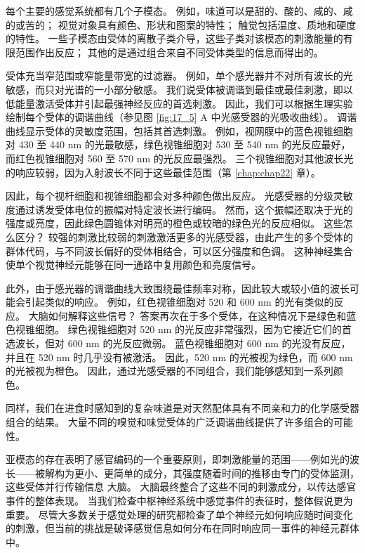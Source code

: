 每个主要的感觉系统都有几个子模态。 
例如，味道可以是甜的、酸的、咸的、咸的或苦的； 
视觉对象具有颜色、形状和图案的特性； 
触觉包括温度、质地和硬度的特性。 
一些子模态由受体的离散子类介导，这些子类对该模态的刺激能量的有限范围作出反应； 
其他的是通过组合来自不同受体类型的信息而得出的。


受体充当窄范围或窄能量带宽的过滤器。 
例如，单个感光器并不对所有波长的光敏感，而只对光谱的一小部分敏感。 
我们说受体被调谐到最佳或最佳刺激，即以低能量激活受体并引起最强神经反应的首选刺激。 
因此，我们可以根据生理实验绘制每个受体的调谐曲线（参见图 \ref{fig:17_5} A 中光感受器的光吸收曲线）。 
调谐曲线显示受体的灵敏度范围，包括其首选刺激。 
例如，视网膜中的蓝色视锥细胞对 430 至 440 nm 的光最敏感，绿色视锥细胞对 530 至 540 nm 的光反应最好，而红色视锥细胞对 560 至 570 nm 的光反应最强烈。 
三个视锥细胞对其他波长光的响应较弱，因为入射波长不同于这些最佳范围（第 \ref{chap:chap22} 章）。


因此，每个视杆细胞和视锥细胞都会对多种颜色做出反应。 
光感受器的分级灵敏度通过诱发受体电位的振幅对特定波长进行编码。 
然而，这个振幅还取决于光的强度或亮度，因此绿色圆锥体对明亮的橙色或较暗的绿色光的反应相似。 
这些怎么区分？ 
较强的刺激比较弱的刺激激活更多的光感受器，由此产生的多个受体的群体代码，与不同波长偏好的受体相结合，可以区分强度和色调。 
这种神经集合使单个视觉神经元能够在同一通路中复用颜色和亮度信号。


此外，由于感光器的调谐曲线大致围绕最佳频率对称，因此较大或较小值的波长可能会引起类似的响应。 
例如，红色视锥细胞对 520 和 600 nm 的光有类似的反应。 
大脑如何解释这些信号？ 
答案再次在于多个受体，在这种情况下是绿色和蓝色视锥细胞。 
绿色视锥细胞对 520 nm 的光反应非常强烈，因为它接近它们的首选波长，但对 600 nm 的光反应微弱。 
蓝色视锥细胞对 600 nm 的光没有反应，并且在 520 nm 时几乎没有被激活。 
因此，520 nm 的光被视为绿色，而 600 nm 的光被视为橙色。 
因此，通过光感受器的不同组合，我们能够感知到一系列颜色。


同样，我们在进食时感知到的复杂味道是对天然配体具有不同亲和力的化学感受器组合的结果。 
大量不同的嗅觉和味觉受体的广泛调谐曲线提供了许多组合的可能性。


亚模态的存在表明了感官编码的一个重要原则，即刺激能量的范围——例如光的波长——被解构为更小、更简单的成分，其强度随着时间的推移由专门的受体监测，这些受体并行传输信息 大脑。
大脑最终整合了这些不同的刺激成分，以传达感官事件的整体表现。 
当我们检查中枢神经系统中感觉事件的表征时，整体假说更为重要。 
尽管大多数关于感觉处理的研究都检查了单个神经元如何响应随时间变化的刺激，但当前的挑战是破译感觉信息如何分布在同时响应同一事件的神经元群体中。


